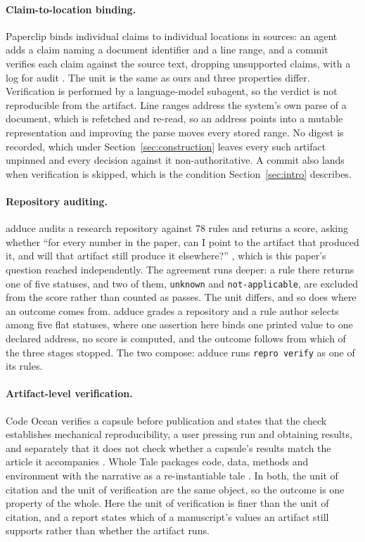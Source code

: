 \documentclass{article}
\newcommand{\code}[1]{\texttt{#1}}
\newcommand{\tVerifyCmd}{\code{repro verify}}
\begin{document}
\paragraph{Claim-to-location binding.} Paperclip binds individual claims to individual locations
in sources: an agent adds a claim naming a document identifier and a line range, and a commit
verifies each claim against the source text, dropping unsupported claims, with a log for audit
\citep{gxl2026paperclip}. The unit is the same as ours and three properties differ. Verification
is performed by a language-model subagent, so the verdict is not reproducible from the artifact.
Line ranges address the system's own parse of a document, which is refetched and re-read, so an
address points into a mutable representation and improving the parse moves every stored range. No
digest is recorded, which under Section~\ref{sec:construction} leaves every such artifact unpinned
and every decision against it non-authoritative. A commit also lands when verification is skipped,
which is the condition Section~\ref{sec:intro} describes.

\paragraph{Repository auditing.} adduce audits a research repository against 78 rules and
returns a score, asking whether ``for every number in the paper, can I point to the artifact that
produced it, and will that artifact still produce it elsewhere?'' \citep{chudasama2026adduce}, which
is this paper's question reached independently. The agreement runs deeper: a rule there returns one
of five statuses, and two of them, \code{unknown} and \code{not-applicable}, are excluded from the
score rather than counted as passes. The unit differs, and so does where an outcome comes from.
adduce grades a repository and a rule author selects among five flat statuses, where one assertion
here binds one printed value to one declared address, no score is computed, and the outcome follows
from which of the three stages stopped. The two compose: adduce runs \tVerifyCmd{} as one of its rules.

\paragraph{Artifact-level verification.} Code Ocean verifies a capsule before publication and
states that the check establishes mechanical reproducibility, a user pressing run and obtaining
results, and separately that it does not check whether a capsule's results match the article it
accompanies \citep{codeocean2026verification}. Whole Tale packages code, data, methods and
environment with the narrative as a re-instantiable tale \citep{brinckman2019wholetale}. In both,
the unit of citation and the unit of verification are the same object, so the outcome is one
property of the whole. Here the unit of verification is finer than the unit of citation, and a
report states which of a manuscript's values an artifact still supports rather than whether the
artifact runs.
\end{document}
